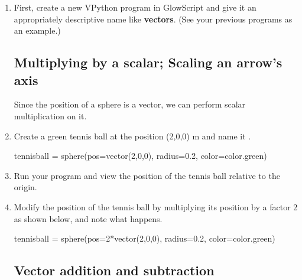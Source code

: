 \begin{enumerate}

	\item First, create a new VPython program in GlowScript and give it an appropriately descriptive name like {\bf vectors}. (See your previous programs as an example.)

	\subsection*{Multiplying by a scalar; Scaling an arrow's axis}

Since the position of a sphere is a vector, we can perform scalar multiplication on it.

	\item Create a green tennis ball at the position (2,0,0) m and name it .

\begin{myvpython}
tennisball = sphere(pos=vector(2,0,0), radius=0.2, color=color.green)
\end{myvpython}

	\item Run your program and view the position of the tennis ball relative to the origin.

	\item Modify the position of the tennis ball by multiplying its position by a factor 2 as shown below, and note what happens.

\begin{myvpython}
tennisball = sphere(pos=2*vector(2,0,0), radius=0.2, color=color.green)
\end{myvpython}
	


	\subsection*{Vector addition and subtraction}


\end{enumerate}

